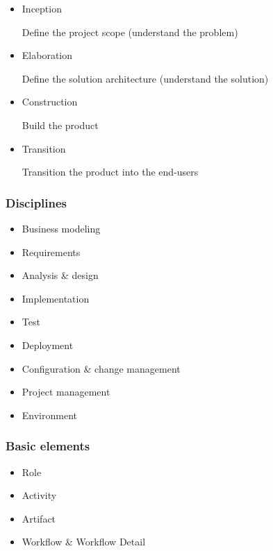 \documentclass[../ESOF_notes.tex]{subfiles}
\begin{document}
\begin{itemize}
    \item Inception
    
    Define the project scope (understand the problem)
    \item Elaboration
    
    Define the solution architecture (understand the solution)
    \item Construction
    
    Build the product
    \item Transition
    
    Transition the product into the end-users
\end{itemize}

\subsubsection{Disciplines}

\begin{itemize}
    \item Business modeling
    \item Requirements
    \item Analysis \& design
    \item Implementation
    \item Test
    \item Deployment
    \item Configuration \& change management
    \item Project management
    \item Environment
\end{itemize}

\subsubsection{Basic elements}
\begin{itemize}
    \item Role
    \item Activity
    \item Artifact
    \item Workflow \& Workflow Detail
\end{itemize}
\end{document}
